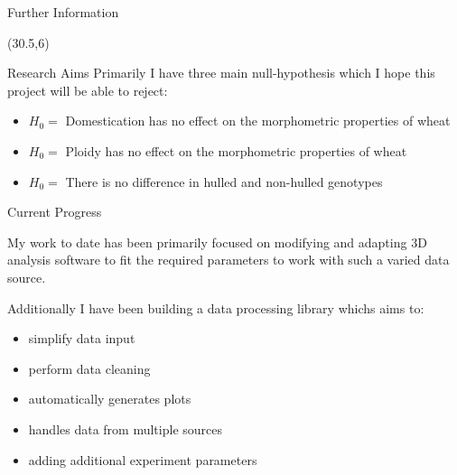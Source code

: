 \documentclass[final]{beamer}
\begin{document}
\begin{frame}{}
\begin{textblock}{27.7}
\begin{block}{Further Information}
    \end{block}


  \end{textblock}

  \begin{textblock}{27.7}(30.5,6)

    \begin{block}{Research Aims}
      Primarily I have three main null-hypothesis which I hope this project will be able to reject:

      \begin{itemize}
      \item{$H_0=$ Domestication has no effect on the morphometric properties of wheat}
      \item{$H_0=$ Ploidy has no effect on the morphometric properties of wheat}
      \item{$H_0=$ There is no difference in hulled and non-hulled genotypes}
      \end{itemize}
      
    \end{block}

    
    \begin{block}{Current Progress}

      My work to date has been primarily focused on modifying
      and adapting 3D analysis software to fit the required
      parameters to work with such a varied data source.

      \vspace{0.3cm}

      Additionally I have been building a data processing library whichs aims to:
      \begin{multicols}{2}
        
        \begin{itemize}
        \item simplify data input
        \item perform data cleaning
        \item automatically generates plots
        \end{itemize}

        \columnbreak

        \begin{itemize}
        \item handles data from multiple sources
        \item adding additional experiment parameters
        \end{itemize}


\end{multicols}
\end{block}
\end{textblock}
\end{frame}
\end{document}
